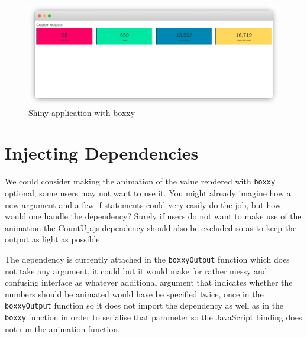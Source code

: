 \documentclass[
]{krantz}
\makeatletter
\newenvironment{Shaded}{\begin{snugshade}}{\end{snugshade}}
\newcommand{\CommentTok}[1]{\textcolor[rgb]{0.37,0.37,0.37}{\textit{#1}}}
\newcommand{\ControlFlowTok}[1]{\textcolor[rgb]{0.27,0.27,0.27}{\textbf{#1}}}
\newcommand{\DataTypeTok}[1]{\textcolor[rgb]{0.27,0.27,0.27}{#1}}
\newcommand{\DecValTok}[1]{\textcolor[rgb]{0.06,0.06,0.06}{#1}}
\newcommand{\KeywordTok}[1]{\textcolor[rgb]{0.27,0.27,0.27}{\textbf{#1}}}
\newcommand{\NormalTok}[1]{#1}
\newcommand{\OperatorTok}[1]{\textcolor[rgb]{0.43,0.43,0.43}{\textbf{#1}}}
\newcommand{\OtherTok}[1]{\textcolor[rgb]{0.37,0.37,0.37}{#1}}
\newcommand{\StringTok}[1]{\textcolor[rgb]{0.5,0.5,0.5}{#1}}
\newenvironment{kframe}{%
\medskip{}
\setlength{\fboxsep}{.8em}
 \def\at@end@of@kframe{}%
 \ifinner\ifhmode%
  \def\at@end@of@kframe{\end{minipage}}%
  \begin{minipage}{\columnwidth}%
 \fi\fi%
 \def\FrameCommand##1{\hskip\@totalleftmargin \hskip-\fboxsep
 \colorbox{shadecolor}{##1}\hskip-\fboxsep
     \hskip-\linewidth \hskip-\@totalleftmargin \hskip\columnwidth}%
 \MakeFramed {\advance\hsize-\width
   \@totalleftmargin\z@ \linewidth\hsize
   \@setminipage}}%
 {\par\unskip\endMakeFramed%
 \at@end@of@kframe}
\renewenvironment{Shaded}{\begin{kframe}}{\end{kframe}}
\makeatother
\begin{document}
\begin{figure}
\centering
\includegraphics{images/custom-output-boxxy.png}
\caption{Shiny application with boxxy}
\end{figure}

\hypertarget{shiny-output-inject}{%
\section{Injecting Dependencies}\label{shiny-output-inject}}

We could consider making the animation of the value rendered with \texttt{boxxy} optional, some users may not want to use it. You might already imagine how a new argument and a few if statements could very easily do the job, but how would one handle the dependency? Surely if users do not want to make use of the animation the CountUp.js dependency should also be excluded so as to keep the output as light as possible.

The dependency is currently attached in the \texttt{boxxyOutput} function which does not take any argument, it could but it would make for rather messy and confusing interface as whatever additional argument that indicates whether the numbers should be animated would have be specified twice, once in the \texttt{boxxyOutput} function so it does not import the dependency as well as in the \texttt{boxxy} function in order to serialise that parameter so the JavaScript binding does not run the animation function.

\begin{Shaded}
\end{Shaded}
\end{document}
